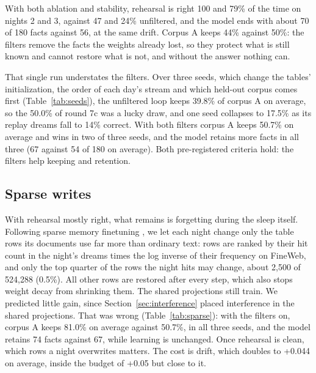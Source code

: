 \documentclass[11pt]{article}
\begin{document}
With both ablation and stability, rehearsal is right 100 and 79\% of the time
on nights 2 and 3, against 47 and 24\% unfiltered, and the model ends with
about 70 of 180 facts against 56, at the same drift. Corpus A keeps 44\%
against 50\%: the filters remove the facts the weights already lost, so they
protect what is still known and cannot restore what is not, and without the
answer nothing can.

That single run understates the filters. Over three seeds, which change the
tables' initialization, the order of each day's stream and which held-out
corpus comes first (Table~\ref{tab:seeds}), the unfiltered loop keeps 39.8\%
of corpus A on average, so the 50.0\% of round 7c was a lucky draw, and one
seed collapses to 17.5\% as its replay dreams fall to 14\% correct. With both
filters corpus A keeps 50.7\% on average and wins in two of three seeds, and
the model retains more facts in all three (67 against 54 of 180 on average).
Both pre-registered criteria hold: the filters help keeping and retention.

\subsection{Sparse writes}
\label{sec:sparse}
With rehearsal mostly right, what remains is forgetting during the sleep
itself. Following sparse memory finetuning \citep{lin2025sparsememft}, we let
each night change only the table rows its documents use far more than ordinary
text: rows are ranked by their hit count in the night's dreams times the log
inverse of their frequency on FineWeb, and only the top quarter of the rows the
night hits may change, about 2{,}500 of 524{,}288 (0.5\%). All other rows are
restored after every step, which also stops weight decay from shrinking them.
The shared projections still train. We predicted little gain, since
Section~\ref{sec:interference} placed interference in the shared projections. That was wrong
(Table~\ref{tab:sparse}): with the filters on, corpus A keeps 81.0\% on
average against 50.7\%, in all three seeds, and the model retains 74 facts
against 67, while learning is unchanged. Once rehearsal is clean, which rows a
night overwrites matters. The cost is drift, which doubles to +0.044 on
average, inside the budget of +0.05 but close to it.
\end{document}
